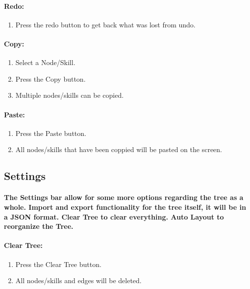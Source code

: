 \documentclass[12pt]{article}
\begin{document}
\paragraph{Redo:}
\begin{enumerate}
	\item Press the redo button to get back what was lost from undo.
\end{enumerate}

\paragraph{Copy:}
\begin{enumerate}
	\item Select a Node/Skill.
	\item Press the Copy button.
	\item Multiple nodes/skills can be copied.
\end{enumerate}

\paragraph{Paste:}
\begin{enumerate}
	\item Press the Paste button.
	\item All nodes/skills that have been coppied will be pasted on the screen.
\end{enumerate}

\subsection{Settings}
\paragraph{The Settings bar allow for some more options regarding the tree as a whole. Import and export functionality for the tree itself, it will be in a JSON format. Clear Tree to clear everything. Auto Layout to reorganize the Tree.}

\paragraph{Clear Tree:}
\begin{enumerate}
	\item Press the Clear Tree button.
	\item All nodes/skills and edges will be deleted.
\end{enumerate}
\end{document}
